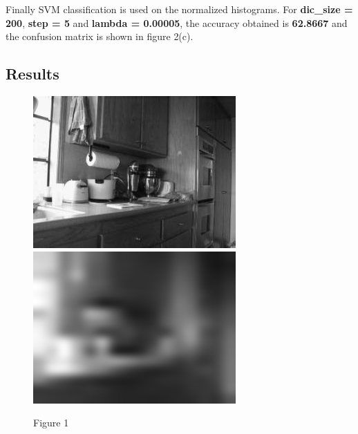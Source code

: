 \documentclass[letter, 11pt]{article}
\begin{document}
Finally SVM classification is used on the normalized histograms. For \textbf{dic\_size = 200}, \textbf{step = 5} and \textbf{lambda = 0.00005}, the accuracy obtained is \textbf{62.8667} and the confusion matrix is shown in figure 2(c).

\subsection*{Results}
\begin{figure}[H]
        \centering
        \includegraphics[width=\textwidth]{HW3/RESULT/original.png}
    \endminipage\hfill
        \centering
        \includegraphics[width=\textwidth]{HW3/RESULT/tiny.png}
    \endminipage\hfill
    \caption*{Figure 1}
\end{figure}
\end{document}

